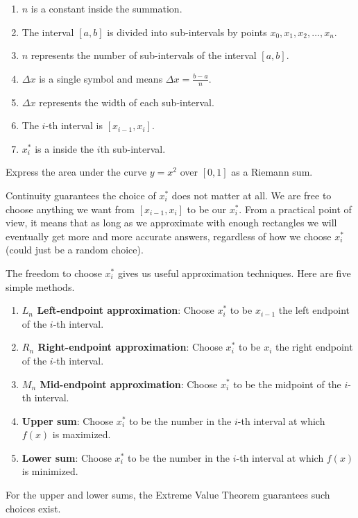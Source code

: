 \documentclass[../main.tex]{subfiles}
\begin{document}

\begin{enumerate}
  \item \(n\) is a constant inside the summation.
  \item The interval \([a,b]\) is divided into sub-intervals by points \(x_{0}, x_{1}, x_{2}, \dots, x_{n}\). 
  \item \(n\) represents the number of sub-intervals of the interval \([a,b]\). 
  \item \(\Delta x\) is a single symbol and means \(\Delta x = \frac{b-a}{n}\).
  \item \(\Delta x\) represents the width of each sub-interval.
  \item The \(i\)-th interval is \([x_{i-1}, x_{i}]\).
  \item \(x_{i}^{*}\) is a  inside the \(i\)th sub-interval.
\end{enumerate}

\begin{example}
  Express the area under the curve \(y = x^{2}\) over \([0,1]\) as a Riemann sum.

\end{example}

\clearpage
Continuity guarantees the choice of \(x_{i}^{*}\) does not matter at all. We are free to choose anything we want from \([x_{i-1}, x_{i}]\) to be our \(x_{i}^{*}\). From a practical point of view, it means that as long as we approximate with enough rectangles we will eventually get more and more accurate answers, regardless of how we choose \(x_{i}^{*}\) (could just be a random choice).

The freedom to choose \(x_{i}^{*}\) gives us useful approximation techniques.  Here are five simple methods.
\begin{enumerate}
  \item \textbf{\(L_{n}\) Left-endpoint approximation}: Choose \(x_{i}^{*}\) to be \(x_{i-1}\) the left endpoint of the \(i\)-th interval.
  \item \textbf{\(R_{n}\) Right-endpoint approximation}: Choose \(x_{i}^{*}\) to be \(x_{i}\) the right endpoint of the \(i\)-th interval.
  \item \textbf{\(M_{n}\) Mid-endpoint approximation}: Choose \(x_{i}^{*}\) to be the midpoint of the \(i\)-th interval.
  \item \textbf{Upper sum}: Choose \(x_{i}^{*}\) to be the number in the \(i\)-th interval at which \(f(x)\) is maximized.
  \item \textbf{Lower sum}: Choose \(x_{i}^{*}\) to be the number in the \(i\)-th interval at which \(f(x)\) is minimized.
\end{enumerate}
For the upper and lower sums, the Extreme Value Theorem guarantees such choices exist.
\end{document}
